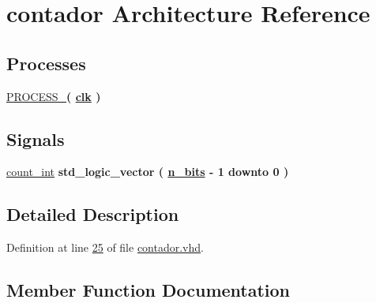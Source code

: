 \hypertarget{classcontador_1_1contador}{}\section{contador Architecture Reference}
\label{classcontador_1_1contador}
\subsection*{Processes}
 \begin{DoxyCompactItemize}
\item 
\hyperlink{classcontador_1_1contador_a00d9e7e8c17b5cd71bc4c4b432911468}{P\+R\+O\+C\+E\+S\+S\+\_}{\bfseries  ( {\bfseries {\bfseries \hyperlink{classcontador_a4a4609c199d30b3adebbeb3a01276ec5}{clk}} \textcolor{vhdlchar}{ }} )}
\end{DoxyCompactItemize}
\subsection*{Signals}
 \begin{DoxyCompactItemize}
\item 
\hyperlink{classcontador_1_1contador_a591dd47ce674ec0d3b488d8705b8e838}{count\+\_\+int} {\bfseries \textcolor{comment}{std\+\_\+logic\+\_\+vector}\textcolor{vhdlchar}{ }\textcolor{vhdlchar}{(}\textcolor{vhdlchar}{ }\textcolor{vhdlchar}{ }\textcolor{vhdlchar}{ }\textcolor{vhdlchar}{ }{\bfseries \hyperlink{classcontador_a986eb173f34190032418b47b9fc9b457}{n\+\_\+bits}} \textcolor{vhdlchar}{-\/}\textcolor{vhdlchar}{ } \textcolor{vhdldigit}{1} \textcolor{vhdlchar}{ }\textcolor{keywordflow}{downto}\textcolor{vhdlchar}{ }\textcolor{vhdlchar}{ } \textcolor{vhdldigit}{0} \textcolor{vhdlchar}{ }\textcolor{vhdlchar}{)}\textcolor{vhdlchar}{ }} 
\end{DoxyCompactItemize}


\subsection{Detailed Description}


Definition at line \hyperlink{contador_8vhd_source_l00025}{25} of file \hyperlink{contador_8vhd_source}{contador.\+vhd}.



\subsection{Member Function Documentation}
\hypertarget{classcontador_1_1contador_a00d9e7e8c17b5cd71bc4c4b432911468}{}
